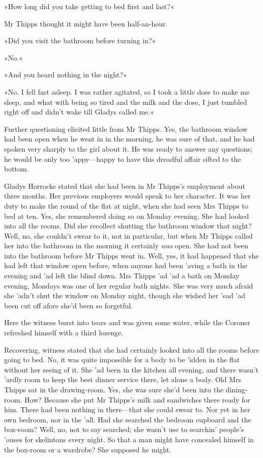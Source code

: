»How long did you take getting to bed first and last?«

Mr Thipps thought it might have been half-an-hour.

»Did you visit the bathroom before turning in?«

»No.«

»And you heard nothing in the night?«

»No. I fell fast asleep. I was rather agitated, so I took a little dose to make me sleep, and what with being so tired and the milk and the dose, I just tumbled right off and didn't wake till Gladys called me.«

Further questioning elicited little from Mr Thipps. Yes, the bathroom window had been open when he went in in the morning, he was sure of that, and he had spoken very sharply to the girl about it. He was ready to answer any questions; he would be only too 'appy\allowbreak---\allowbreak happy to have this dreadful affair sifted to the bottom.

Gladys Horrocks stated that she had been in Mr Thipps's employment about three months. Her previous employers would speak to her character. It was her duty to make the round of the flat at night, when she had seen Mrs Thipps to bed at ten. Yes, she remembered doing so on Monday evening. She had looked into all the rooms. Did she recollect shutting the bathroom window that night? Well, no, she couldn't swear to it, not in particular, but when Mr Thipps called her into the bathroom in the morning it certainly \textit{was} open. She had not been into the bathroom before Mr Thipps went in. Well, yes, it had happened that she had left that window open before, when anyone had been 'aving a bath in the evening and 'ad left the blind down. Mrs Thipps 'ad 'ad a bath on Monday evening, Mondays was one of her regular bath nights. She was very much afraid she 'adn't shut the window on Monday night, though she wished her 'ead 'ad been cut off afore she'd been so forgetful.

Here the witness burst into tears and was given some water, while the Coroner refreshed himself with a third lozenge.

Recovering, witness stated that she had certainly looked into all the rooms before going to bed. No, it was quite impossible for a body to be 'idden in the flat without her seeing of it. She 'ad been in the kitchen all evening, and there wasn't 'ardly room to keep the best dinner service there, let alone a body. Old Mrs Thipps sat in the drawing-room. Yes, she was sure she'd been into the dining-room. How? Because she put Mr Thipps's milk and sandwiches there ready for him. There had been nothing in there\allowbreak---\allowbreak that she could swear to. Nor yet in her own bedroom, nor in the 'all. Had she searched the bedroom cupboard and the box-room? Well, no, not to say searched; she wasn't use to searchin' people's 'ouses for skelintons every night. So that a man might have concealed himself in the box-room or a wardrobe? She supposed he might.

